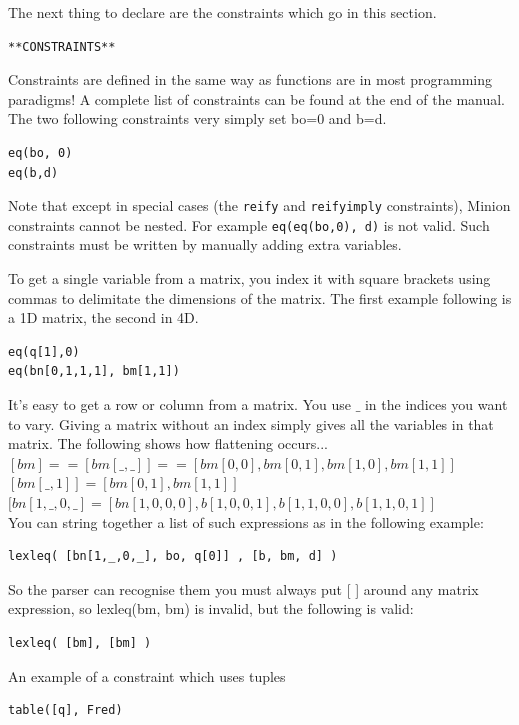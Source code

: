 \documentclass[oneside]{book}
\begin{document}
The next thing to declare are the constraints which go in  this section.
\begin{verbatim}
**CONSTRAINTS**
\end{verbatim}

Constraints are defined in the same way as functions are in most programming paradigms!  A complete list of constraints can be found at the end of  the manual. The two following constraints very simply set bo=0 and b=d.
\begin{verbatim}
eq(bo, 0)
eq(b,d)
\end{verbatim}

Note that except in special cases (the \texttt{reify} and \texttt{reifyimply} constraints), Minion constraints cannot be nested. For example \texttt{eq(eq(bo,0), d)} is not valid. Such constraints must be written by manually adding extra variables.

To get a single variable from a matrix, you index it with square brackets using commas to delimitate the dimensions of the matrix. The first example following is a 1D matrix, the second in 4D. 
\begin{verbatim}
eq(q[1],0)
eq(bn[0,1,1,1], bm[1,1])
\end{verbatim}

It's easy to get a row or column from a matrix.  You use $\_$ in the indices you want to vary.  Giving a matrix without an index simply gives all the variables in that matrix. The following shows how flattening occurs...\\
$[bm] == [ bm[\_,\_] ] == [ bm[0,0], bm[0,1], bm[1,0], bm[1,1] ]$\\
$[ bm[\_,1] ] = [ bm[0,1], bm[1,1] ]$\\
$[ bn[1,\_,0,\_] = [ bn[1,0,0,0], b[1,0,0,1], b[1,1,0,0], b[1,1,0,1] ]$\\

You can string together a list of such expressions as in the following example:
\begin{verbatim}
lexleq( [bn[1,_,0,_], bo, q[0]] , [b, bm, d] )
\end{verbatim}

So the parser can recognise them you must always put [ ] around any matrix expression, so lexleq(bm, bm) is invalid, but the following is valid:
\begin{verbatim}
lexleq( [bm], [bm] )
\end{verbatim}

An example of a constraint which uses tuples
\begin{verbatim}
table([q], Fred)
\end{verbatim}
\end{document}
